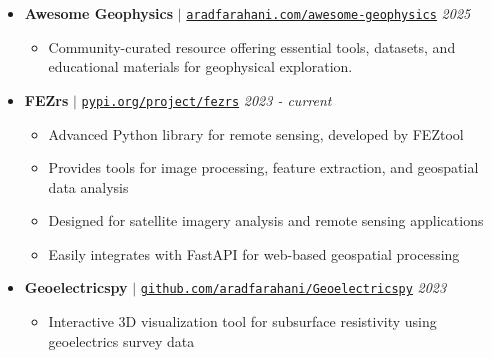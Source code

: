 \documentclass[letterpaper,11pt]{article}
\begin{document}
\begin{itemize}[left=0pt, label={}, topsep=7.5pt, partopsep=0pt, itemsep=6pt, parsep=0pt]
	\item \textbf{Awesome Geophysics} $|$ \normalfont\href{https://aradfarahani.com/awesome-geophysics/}{\texttt{aradfarahani.com/awesome-geophysics}} \hfill \textit{2025}
	\begin{itemize}[left=15pt, label=\textbullet, topsep=4pt, partopsep=0pt, itemsep=3pt, parsep=0pt]
		\item Community-curated resource offering essential tools, datasets, and educational materials for geophysical exploration.
	\end{itemize}
\end{itemize}
\begin{itemize}[left=0pt, label={}, topsep=7.5pt, partopsep=0pt, itemsep=6pt, parsep=0pt]
	\item \textbf{FEZrs} $|$ \normalfont\href{https://pypi.org/project/fezrs/}{\texttt{pypi.org/project/fezrs}} \hfill \textit{2023 - current}
	\begin{itemize}[left=15pt, label=\textbullet, topsep=4pt, partopsep=0pt, itemsep=3pt, parsep=0pt]
		\item Advanced Python library for remote sensing, developed by FEZtool
		\item Provides tools for image processing, feature extraction, and geospatial data analysis
		\item Designed for satellite imagery analysis and remote sensing applications
		\item Easily integrates with FastAPI for web-based geospatial processing
	\end{itemize}
\end{itemize}
\begin{itemize}[left=0pt, label={}, topsep=7.5pt, partopsep=0pt, itemsep=6pt, parsep=0pt]
	\item \textbf{Geoelectricspy} $|$ \normalfont\href{https://github.com/aradfarahani/Geoelectricspy/}{\texttt{github.com/aradfarahani/Geoelectricspy}} \hfill \textit{2023}
	\begin{itemize}[left=15pt, label=\textbullet, topsep=4pt, partopsep=0pt, itemsep=3pt, parsep=0pt]
		\item Interactive 3D visualization tool for subsurface resistivity using geoelectrics survey data
	\end{itemize}
\end{itemize}

\end{document}

